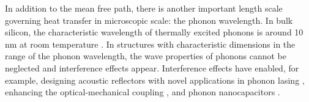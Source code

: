 



In addition to the mean free path, there is another important length scale governing heat transfer in microscopic scale: the phonon wavelength. In bulk silicon, the characteristic wavelength of thermally excited phonons is around 10 nm at room temperature \cite{ju99}. In structures with characteristic dimensions in the range of the phonon wavelength, the wave properties of phonons cannot be neglected and interference effects appear. Interference effects have enabled, for example, designing acoustic reflectors with novel applications in phonon lasing \cite{maryam13}, enhancing the optical-mechanical coupling \cite{fainstein13}, and phonon nanocapacitors \cite{han15}. 

